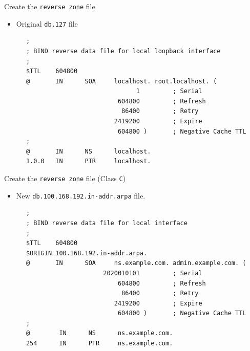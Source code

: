 \documentclass[xcolor=table,aspectratio=169]{beamer}
\begin{document}
\begin{frame}[fragile]{Create the \texttt{reverse zone} file}
  \begin{itemize}
    \item Original \texttt{db.127} file
  \end{itemize}
  \begin{tcolorbox}
    \lstset{
      basicstyle=\tiny\ttfamily,
    }
    \begin{lstlisting}
      ;
      ; BIND reverse data file for local loopback interface
      ;
      $TTL    604800
      @       IN      SOA     localhost. root.localhost. (
                                    1         ; Serial
                               604800         ; Refresh
                                86400         ; Retry
                              2419200         ; Expire
                               604800 )       ; Negative Cache TTL
      ;
      @       IN      NS      localhost.
      1.0.0   IN      PTR     localhost.
    \end{lstlisting}
  \end{tcolorbox}
\end{frame}

\begin{frame}[fragile]{Create the \texttt{reverse zone} file (Class \texttt{C})}
  \begin{itemize}
    \item New \texttt{db.100.168.192.in-addr.arpa} file.
  \end{itemize}
  \begin{tcolorbox}
    \lstset{
      basicstyle=\tiny\ttfamily,
    }
    \begin{lstlisting}
      ;
      ; BIND reverse data file for local interface
      ;
      $TTL    604800
      $ORIGIN 100.168.192.in-addr.arpa.
      @       IN      SOA     ns.example.com. admin.example.com. (
                           2020010101         ; Serial
                               604800         ; Refresh
                                86400         ; Retry
                              2419200         ; Expire
                               604800 )       ; Negative Cache TTL
      ;
      @        IN      NS      ns.example.com.
      254      IN      PTR     ns.example.com.
          \end{lstlisting}
  \end{tcolorbox}
\end{frame}
\end{document}
